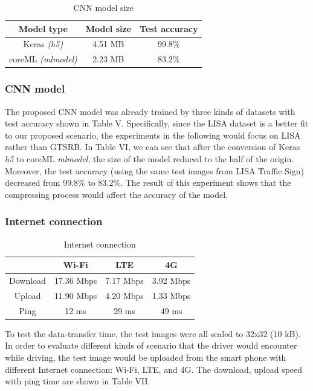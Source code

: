 \documentclass[conference]{IEEEtran}
\begin{document}
\begin{table}[H]
\caption{CNN model size}
\begin{center}
\begin{tabular}{|c|c|c|}
\hline
\textbf{Model type} & \textbf{Model size} & \textbf{Test accuracy }\\
\hline
Keras \textit{(h5)} & 4.51 MB & 99.8\% \\
\hline
coreML \textit{(mlmodel)} & 2.23 MB & 83.2\% \\
\hline
\end{tabular}
\label{tab3}
\end{center}
\end{table}

\subsubsection{CNN model}
The proposed CNN model was already trained by three kinds of datasets with test accuracy shown in Table V. Specifically, since the LISA dataset is a better fit to our proposed scenario, the experiments in the following would focus on LISA rather than GTSRB. In Table VI, we can see that after the conversion of Keras \textit{h5} to coreML \textit{mlmodel}, the size of the model reduced to the half of the origin. Moreover, the test accuracy (using the same test images from LISA Traffic Sign) decreased from 99.8\% to 83.2\%. The result of this experiment shows that the compressing process would affect the accuracy of the model.

\subsubsection{Internet connection}
\begin{table}[H]
\caption{Internet connection}
\begin{center}
\begin{tabular}{|c|c|c|c|}
\hline
& \textbf{Wi-Fi} & \textbf{LTE} & \textbf{4G}\\
\hline
Download & 17.36 Mbps & 7.17 Mbps & 3.92 Mbps\\
\hline
Upload & 11.90 Mbps & 4.20 Mbps & 1.33 Mbps\\
\hline
Ping & 12 ms & 29 ms & 49 ms\\
\hline
\end{tabular}
\label{tab4}
\end{center}
\end{table}
To test the data-transfer time, the test images were all scaled to 32x32 (10 kB). In order to evaluate different kinds of scenario that the driver would encounter while driving, the test image would be uploaded from the smart phone with different Internet connection: Wi-Fi, LTE, and 4G. The download, upload speed with ping time are shown in Table VII. 
\end{document}
